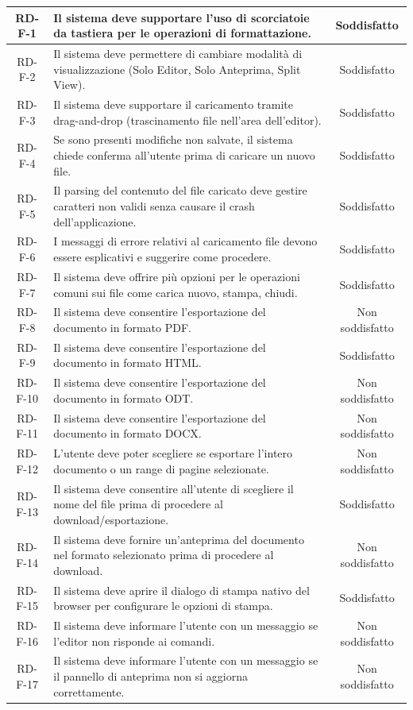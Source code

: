 \documentclass[11pt,a4paper]{article}
\begin{document}
\begin{longtable}{|c|p{11cm}|c|}
RD-F-1 & Il sistema deve supportare l'uso di scorciatoie da tastiera per le operazioni di formattazione. & Soddisfatto \\
\hline
RD-F-2 & Il sistema deve permettere di cambiare modalità di visualizzazione (Solo Editor, Solo Anteprima, Split View). & Soddisfatto \\
\hline
RD-F-3 & Il sistema deve supportare il caricamento tramite drag-and-drop (trascinamento file nell'area dell'editor). & Soddisfatto \\
\hline
RD-F-4 & Se sono presenti modifiche non salvate, il sistema chiede conferma all'utente prima di caricare un nuovo file. & Soddisfatto\\
\hline
RD-F-5 & Il parsing del contenuto del file caricato deve gestire caratteri non validi senza causare il crash dell'applicazione. & Soddisfatto \\
\hline
RD-F-6 & I messaggi di errore relativi al caricamento file devono essere esplicativi e suggerire come procedere. & Soddisfatto \\
\hline
RD-F-7 & Il sistema deve offrire più opzioni per le operazioni comuni sui file come carica nuovo, stampa, chiudi. & Soddisfatto \\
\hline
RD-F-8 & Il sistema deve consentire l'esportazione del documento in formato PDF. & Non soddisfatto \\
\hline
RD-F-9 & Il sistema deve consentire l'esportazione del documento in formato HTML. & Soddisfatto \\
\hline
RD-F-10 & Il sistema deve consentire l'esportazione del documento in formato ODT. & Non soddisfatto \\
\hline
RD-F-11 & Il sistema deve consentire l'esportazione del documento in formato DOCX. & Non soddisfatto \\
\hline
RD-F-12 & L'utente deve poter scegliere se esportare l'intero documento o un range di pagine selezionate. & Non soddisfatto \\
\hline
RD-F-13 & Il sistema deve consentire all'utente di scegliere il nome del file prima di procedere al download/esportazione. & Soddisfatto \\
\hline
RD-F-14 & Il sistema deve fornire un'anteprima del documento nel formato selezionato prima di procedere al download. & Non soddisfatto \\
\hline
RD-F-15 & Il sistema deve aprire il dialogo di stampa nativo del browser per configurare le opzioni di stampa. & Soddisfatto \\
\hline
RD-F-16 & Il sistema deve informare l'utente con un messaggio se l'editor non risponde ai comandi. & Non soddisfatto\\
\hline
RD-F-17 & Il sistema deve informare l'utente con un messaggio se il pannello di anteprima non si aggiorna correttamente. & Non soddisfatto \\
\hline


\end{longtable}
\end{document}
